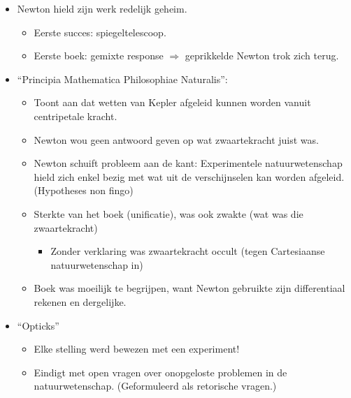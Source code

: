 \documentclass{article}
\begin{document}
\begin{itemize}
      \item Newton hield zijn werk redelijk geheim.
      \begin{itemize}
        \item Eerste succes: spiegeltelescoop.
        \item Eerste boek: gemixte response $\Rightarrow$ geprikkelde Newton trok zich terug.
      \end{itemize}
      \item ``Principia Mathematica Philosophiae Naturalis'':
      \begin{itemize}
        \item Toont aan dat wetten van Kepler afgeleid kunnen worden vanuit centripetale kracht.
        \item Newton wou geen antwoord geven op wat zwaartekracht juist was.
        \item Newton schuift probleem aan de kant: Experimentele natuurwetenschap hield zich enkel bezig met wat uit de verschijnselen kan worden afgeleid. (Hypotheses non fingo)
        \item Sterkte van het boek (unificatie), was ook zwakte (wat was die zwaartekracht)
        \begin{itemize}
          \item Zonder verklaring was zwaartekracht occult (tegen Cartesiaanse natuurwetenschap in)
        \end{itemize}
        \item Boek was moeilijk te begrijpen, want Newton gebruikte zijn differentiaal rekenen en dergelijke.
      \end{itemize}
      \item ``Opticks''
      \begin{itemize}
        \item Elke stelling werd bewezen met een experiment!
        \item Eindigt met open vragen over onopgeloste problemen in de natuurwetenschap. (Geformuleerd als retorische vragen.)
      \end{itemize}
    \end{itemize}

  \newpage
\end{document}
